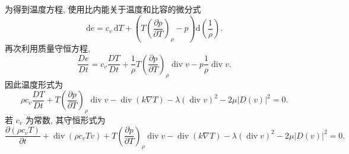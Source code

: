 为得到温度方程, 使用比内能关于温度和比容的微分式
\[
  \mathrm{d}e=c_v\,\mathrm{d}T+\left(T\left(\frac{\partial p}{\partial T}\right)_\rho-p\right)\mathrm{d}\left(\frac1\rho\right).
\]
再次利用质量守恒方程,
\[
  \frac{De}{Dt}=c_v\frac{DT}{Dt}+\frac1\rho T\left(\frac{\partial p}{\partial T}\right)_\rho\operatorname{div}v-p\frac1\rho\operatorname{div}v.
\]
因此温度形式为
\[
\rho c_v\frac{DT}{Dt}+T\left(\frac{\partial p}{\partial T}\right)_\rho\operatorname{div}v
-\operatorname{div}(k\nabla T)-\lambda(\operatorname{div}v)^2-2\mu|D(v)|^2=0.
\]
若 $c_v$ 为常数, 其守恒形式为
\[
\frac{\partial(\rho c_vT)}{\partial t}+\operatorname{div}(\rho c_vTv)
+T\left(\frac{\partial p}{\partial T}\right)_\rho\operatorname{div}v
-\operatorname{div}(k\nabla T)-\lambda(\operatorname{div}v)^2-2\mu|D(v)|^2=0.
\]
